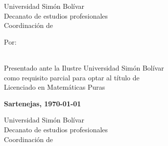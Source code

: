 

\caratulatrue
\paginatitulotrue
\resumentrue
\agradecimientostrue
\listastrue
\toctrue
\introtrue
{}
\basicostrue
\mainproofstrue


\frontmatter
\ifcaratula\newpage
\bgroup
    \centering
    \thispagestyle{empty}

    \PrintUsbLogo
    {
        { \normalfont\large Universidad Simón Bolívar }\\
        Decanato de estudios profesionales\\
        Coordinación de \coord
    }

    \vspace{4cm}

    \UppercaseBold{
        \wrapto[14cm][\centering]
        {\MainTitle}
    }

    \vspace{\fill}

    Por:
    \\
    \autor

    \vspace{\fill}

    \\
    Presentado ante la Ilustre Universidad Simón Bolívar\\
    como requisito parcial para optar al título de\\
    Licenciado en Matemáticas Puras

    \vspace{\fill}

    \textbf{Sartenejas, \today}\par
\egroup
\fi
\ifpaginatitulo\newpage
\bgroup
    \centering
    \thispagestyle{empty}

    \PrintUsbLogo
    {
        { \normalfont\large Universidad Simón Bolívar }\\
        Decanato de estudios profesionales\\
        Coordinación de \coord
    }

